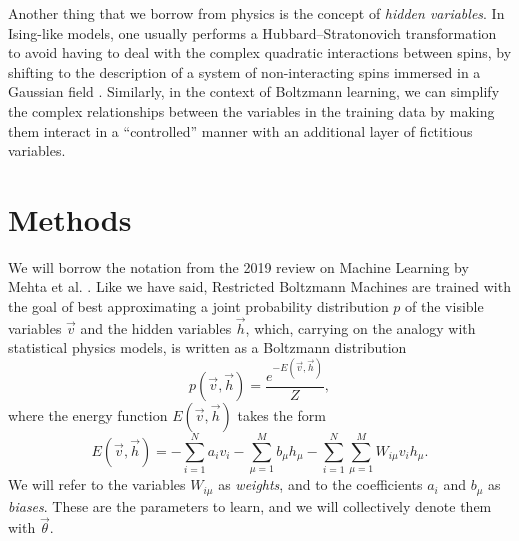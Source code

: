 \documentclass[prl, twocolumn]{revtex4-2}
\begin{document}
Another thing that we borrow from physics is the concept of \emph{hidden
variables}. In Ising-like models, one usually performs a
Hubbard–Stratonovich transformation to avoid having to deal with the
complex quadratic interactions between spins, by shifting to the
description of a system of non-interacting spins immersed in a Gaussian
field \cite{Hubbard1959}. Similarly, in the context of Boltzmann learning,
we can simplify the complex relationships between the variables in the
training data by making them interact in a “controlled” manner with an
additional layer of fictitious variables. 

\section{Methods}
We will borrow the notation from the 2019 review on Machine Learning by
Mehta et al. \cite{Mehta2019}. Like we have said, Restricted Boltzmann
Machines are trained with the goal of best approximating a joint
probability distribution $p$ of the visible variables $\vec{v}$ and the
hidden variables $\vec{h}$, which, carrying on the analogy with statistical
physics models, is written as a Boltzmann distribution
\begin{equation}
    p(\vec{v}, \vec{h}) = \frac{e^{-E(\vec{v}, \vec{h})}}{Z},
\end{equation}
where the energy function $E(\vec{v}, \vec{h})$ takes the form
\begin{equation}
    E(\vec{v}, \vec{h}) = - \sum_{i = 1}^{N} a_i v_i - \sum_{\mu = 1}^{M}
    b_\mu h_\mu - \sum_{i = 1}^{N} \sum_{\mu = 1}^{M} W_{i \mu} v_i h_\mu.
\end{equation}
We will refer to the variables $W_{i\mu}$ as \emph{weights}, and to the
coefficients $a_i$ and $b_\mu$ as \emph{biases}. These are the parameters
to learn, and we will collectively denote them with $\vec{\theta}$.
\end{document}
